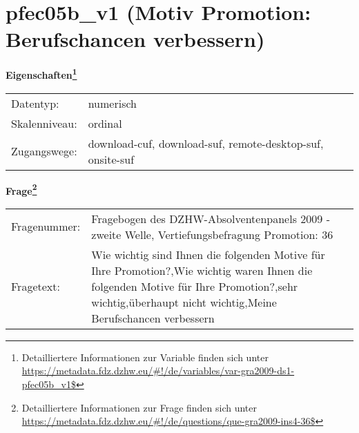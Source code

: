 
    \setcounter{footnote}{0}

    \vspace*{-1.8cm}
	\section{pfec05b\_v1 (Motiv Promotion: Berufschancen verbessern)}
	\label{section:pfec05b_v1}



    \vspace*{0.5cm}
    \noindent\textbf{Eigenschaften\footnote{Detailliertere Informationen zur Variable finden sich unter
		\url{https://metadata.fdz.dzhw.eu/\#!/de/variables/var-gra2009-ds1-pfec05b_v1$}}}\\
	\begin{tabularx}{\hsize}{@{}lX}
	Datentyp: & numerisch \\
	Skalenniveau: & ordinal \\
	Zugangswege: &
	  download-cuf, 
	  download-suf, 
	  remote-desktop-suf, 
	  onsite-suf
 \\
    \end{tabularx}



				\vspace*{0.5cm}
                \noindent\textbf{Frage\footnote{Detailliertere Informationen zur Frage finden sich unter
		              \url{https://metadata.fdz.dzhw.eu/\#!/de/questions/que-gra2009-ins4-36$}}}\\
				\begin{tabularx}{\hsize}{@{}lX}
					Fragenummer: &
					  Fragebogen des DZHW-Absolventenpanels 2009 - zweite Welle, Vertiefungsbefragung Promotion:
					  36
 \\
					Fragetext: & Wie wichtig sind Ihnen die folgenden Motive für Ihre Promotion?,Wie wichtig waren Ihnen die folgenden Motive für Ihre Promotion?,sehr wichtig,überhaupt nicht wichtig,Meine Berufschancen verbessern \\
				\end{tabularx}





